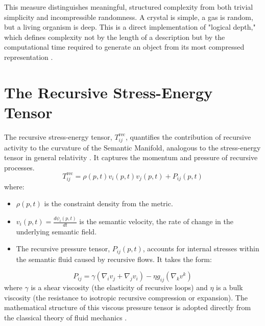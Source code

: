 This measure distinguishes meaningful, structured complexity from both trivial simplicity and incompressible randomness. A crystal is simple, a gas is random, but a living organism is deep. This is a direct implementation of "logical depth," which defines complexity not by the length of a description but by the computational time required to generate an object from its most compressed representation \autocite{Bennett1988}.


\section{The Recursive Stress-Energy Tensor}\label{sec:the_recursive_stress_energy_tensor}

The recursive stress-energy tensor, \(T_{ij}^{\text{rec}}\), quantifies the contribution of recursive activity to the curvature of the Semantic Manifold, analogous to the stress-energy tensor in general relativity \autocite{Einstein1915}. It captures the momentum and pressure of recursive processes.
\begin{equation}
T_{ij}^{\text{rec}} = \rho(p,t) v_i(p,t) v_j(p,t) + P_{ij}(p,t)
\end{equation}
where:
\begin{itemize}
    \item \(\rho(p,t)\) is the constraint density from the metric.
    \item \(v_i(p,t) = \frac{d\psi_i(p,t)}{dt}\) is the semantic velocity, the rate of change in the underlying semantic field.
    \item The recursive pressure tensor, \(P_{ij}(p,t)\), accounts for internal stresses within the semantic fluid caused by recursive flows. It takes the form:
\end{itemize}
\begin{equation}
P_{ij} = \gamma(\nabla_i v_j + \nabla_j v_i) - \eta g_{ij} (\nabla_k v^k)
\end{equation}
where \(\gamma\) is a shear viscosity (the elasticity of recursive loops) and \(\eta\) is a bulk viscosity (the resistance to isotropic recursive compression or expansion). The mathematical structure of this viscous pressure tensor is adopted directly from the classical theory of fluid mechanics \autocite{LandauLifshitz1987}.